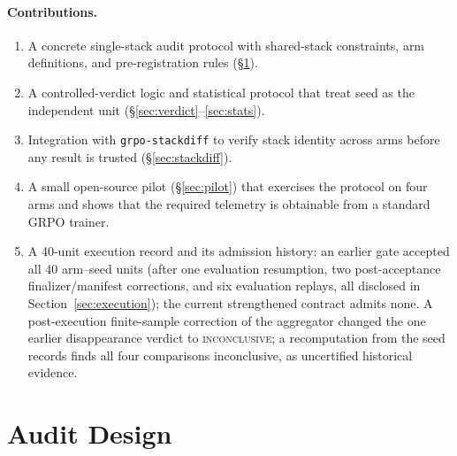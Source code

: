 \documentclass[11pt]{article}
\newcommand{\verdict}[1]{\textsc{#1}}
\begin{document}
\paragraph{Contributions.}
\begin{enumerate}[leftmargin=1.6em, itemsep=2pt]
  \item A concrete single-stack audit protocol with shared-stack constraints,
    arm definitions, and pre-registration rules (\S\ref{sec:design}).
  \item A controlled-verdict logic and statistical protocol that treat seed as
    the independent unit (\S\ref{sec:verdict}--\ref{sec:stats}).
  \item Integration with \texttt{grpo-stackdiff} to verify stack identity
    across arms before any result is trusted (\S\ref{sec:stackdiff}).
  \item A small open-source pilot (\S\ref{sec:pilot}) that exercises the
    protocol on four arms and shows that the required telemetry is obtainable
    from a standard GRPO trainer.
  \item A 40-unit execution record and its admission history: an earlier gate
    accepted all 40 arm--seed units (after one evaluation resumption, two
    post-acceptance finalizer/manifest corrections, and six evaluation
    replays, all disclosed in Section~\ref{sec:execution}); the current
    strengthened contract admits none. A post-execution finite-sample
    correction of the aggregator changed the one earlier disappearance
    verdict to \verdict{inconclusive}; a recomputation from the seed records
    finds all four comparisons inconclusive, as uncertified historical
    evidence.
\end{enumerate}

\section{Audit Design}
\label{sec:design}
\end{document}
